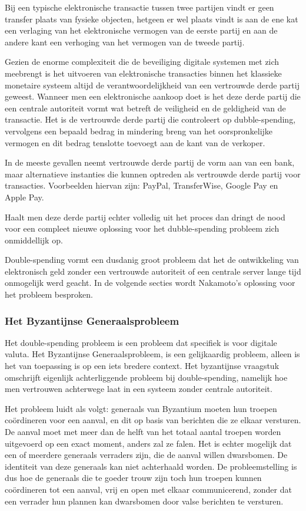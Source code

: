 			Bij een typische elektronische transactie tussen twee partijen vindt er geen transfer plaats van fysieke objecten, hetgeen er wel plaats vindt is aan de ene kat een verlaging van het elektronische vermogen van de eerste partij en aan de andere kant een verhoging van het vermogen van de tweede partij. 
		
			Gezien de enorme complexiteit die de beveiliging digitale systemen met zich meebrengt is het uitvoeren van elektronische transacties binnen het klassieke monetaire systeem altijd de verantwoordelijkheid van een vertrouwde derde partij geweest. Wanneer men een elektronische aankoop doet is het deze derde partij die een centrale autoriteit vormt wat betreft de veiligheid en de geldigheid van de transactie. Het is de vertrouwde derde partij die controleert op dubble-spending, vervolgens een bepaald bedrag in mindering breng van het oorspronkelijke vermogen en dit bedrag tenslotte toevoegt aan de kant van de verkoper. 
			
			In de meeste gevallen neemt vertrouwde derde partij de vorm aan van een bank, maar alternatieve instanties die kunnen optreden als vertrouwde derde partij voor transacties. Voorbeelden hiervan zijn: PayPal, TransferWise, Google Pay en Apple Pay.
		
			Haalt men deze derde partij echter volledig uit het proces dan dringt de nood voor een compleet nieuwe oplossing voor het dubble-spending probleem zich onmiddellijk op.
			
			Double-spending vormt een dusdanig groot probleem dat het de ontwikkeling van elektronisch geld zonder een vertrouwde autoriteit of een centrale server lange tijd onmogelijk werd geacht. In de volgende secties wordt Nakamoto’s oplossing voor het probleem besproken. 
			
			\subsubsection{Het Byzantijnse Generaalsprobleem}
			Het double-spending probleem is een probleem dat specifiek is voor digitale valuta. Het Byzantijnse Generaalsprobleem, is een gelijkaardig probleem, alleen is het van toepassing is op een iets bredere context. Het byzantijnse vraagstuk omschrijft eigenlijk achterliggende probleem bij double-spending, namelijk hoe men vertrouwen achterwege laat in een systeem zonder centrale autoriteit.
			
			Het probleem luidt als volgt: generaals van Byzantium moeten hun troepen coördineren voor een aanval, en dit op basis van berichten die ze elkaar versturen. De aanval moet met meer dan de helft van het totaal aantal troepen worden uitgevoerd op een exact moment, anders zal ze falen. Het is echter mogelijk dat een of meerdere generaals verraders zijn, die de aanval willen dwarsbomen. De identiteit van deze generaals kan niet achterhaald worden. De probleemstelling is dus hoe de generaals die te goeder trouw zijn toch hun troepen kunnen coördineren tot een aanval, vrij en open met elkaar communicerend, zonder dat een verrader hun plannen kan dwarsbomen door valse berichten te versturen.
			
